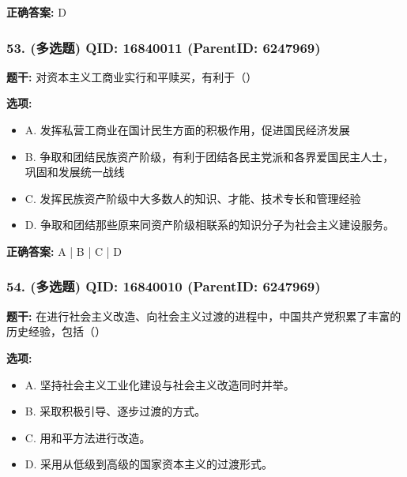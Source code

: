 \documentclass[12pt,UTF8]{ctexart}
\begin{document}
\textbf{正确答案:}
D

\vspace{0.3em}\hrulefill\vspace{0.7em}

\subsubsection*{53. (多选题) \small QID: 16840011 (ParentID: 6247969)}

\textbf{题干:}
对资本主义工商业实行和平赎买，有利于（）



\textbf{选项:}
\begin{itemize}[leftmargin=*]

  \item A. 发挥私营工商业在国计民生方面的积极作用，促进国民经济发展

  \item B. 争取和团结民族资产阶级，有利于团结各民主党派和各界爱国民主人士，巩固和发展统一战线

  \item C. 发挥民族资产阶级中大多数人的知识、才能、技术专长和管理经验

  \item D. 争取和团结那些原来同资产阶级相联系的知识分子为社会主义建设服务。

\end{itemize}

\textbf{正确答案:}
A | B | C | D

\vspace{0.3em}\hrulefill\vspace{0.7em}

\subsubsection*{54. (多选题) \small QID: 16840010 (ParentID: 6247969)}

\textbf{题干:}
在进行社会主义改造、向社会主义过渡的进程中，中国共产党积累了丰富的历史经验，包括（）



\textbf{选项:}
\begin{itemize}[leftmargin=*]

  \item A. 坚持社会主义工业化建设与社会主义改造同时并举。

  \item B. 采取积极引导、逐步过渡的方式。

  \item C. 用和平方法进行改造。

  \item D. 采用从低级到高级的国家资本主义的过渡形式。

\end{itemize}
\end{document}
